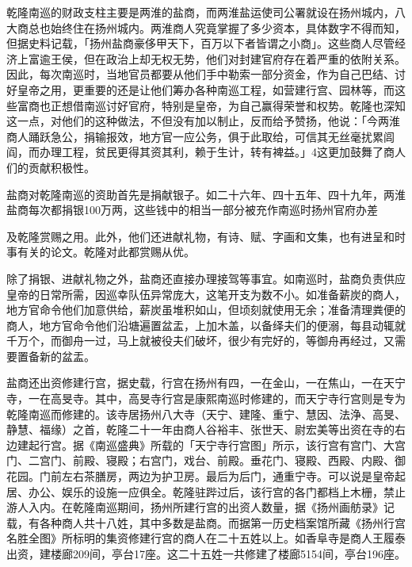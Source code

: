 乾隆南巡的财政支柱主要是两淮的盐商，而两淮盐运使司公署就设在扬州城内，八大商总也始终住在扬州城内。两淮商人究竟掌握了多少资本，具体数字不得而知，但据史料记载，「扬州盐商豪侈甲天下，百万以下者皆谓之小商」。这些商人尽管经济上富逾王侯，但在政治上却无权无势，他们对封建官府存在着严重的依附关系。因此，每次南巡时，当地官员都要从他们手中勒索一部分资金，作为自己巴结、讨好皇帝之用，更重要的还是让他们筹办各种南巡工程，如营建行宫、园林等，而这些富商也正想借南巡讨好官府，特别是皇帝，为自己赢得荣誉和权势。乾隆也深知这一点，对他们的这种做法，不但没有加以制止，反而给予赞扬，他说：「今两淮商人踊跃急公，捐输报效，地方官一应公务，俱于此取给，可信其无丝毫扰累闾阎，而办理工程，贫民更得其资其利，赖于生计，转有裨益。」4这更加鼓舞了商人们的贡献积极性。

盐商对乾隆南巡的资助首先是捐献银子。如二十六年、四十五年、四十九年，两淮盐商每次都捐银100万两，这些钱中的相当一部分被充作南巡时扬州官府办差

\vfill
\begin{BookNotes}
\end{BookNotes}

\noindent 及乾隆赏赐之用。此外，他们还进献礼物，有诗、赋、字画和文集，也有进呈和时事有关的论文。乾隆对此都赏赐从优。

除了捐银、进献礼物之外，盐商还直接办理接驾等事宜。如南巡时，盐商负责供应皇帝的日常所需，因巡幸队伍异常庞大，这笔开支为数不小。如准备薪炭的商人，地方官命令他们加意供给，薪炭虽堆积如山，但顷刻就使用无余；准备清理粪便的商人，地方官命令他们沿塘遍置盆盂，上加木盖，以备绎夫们的便溺，每县动辄就千万个，而御舟一过，马上就被役夫们破坏，很少有完好的，等御舟再经过，又需要置备新的盆盂。

盐商还出资修建行宫，据史载，行宫在扬州有四，一在金山，一在焦山，一在天宁寺，一在高旻寺。其中，高旻寺行宫是康熙南巡时修建的，而天宁寺行宫则是专为乾隆南巡而修建的。该寺居扬州八大寺（天宁、建隆、重宁、慧因、法浄、高旻、静慧、福缘）之首，乾隆二十一年由商人谷裕丰、张世天、尉宏美等出资在寺的右边建起行宫。据《南巡盛典》所载的「天宁寺行宫图」所示，该行宫有宫门、大宫门、二宫门、前殿、寝殿；右宫门，戏台、前殿。垂花门、寝殿、西殿、内殿、御花园。门前左右茶膳房，两边为护卫房。最后为后门，通重宁寺。可以说是皇帝起居、办公、娱乐的设施一应俱全。乾隆驻跸过后，该行宫的各门都档上木栅，禁止游人入内。在乾隆南巡期间，扬州所建行宫的出资人数量，据《扬州画舫录》记载，有各种商人共十八姓，其中多数是盐商。而据第一历史档案馆所藏《扬州行宫名胜全图》所标明的集资修建行宫的商人在二十五姓以上。如香阜寺是商人王履泰出资，建楼廊209间，亭台17座。这二十五姓一共修建了楼廊5154间，亭台196座。

